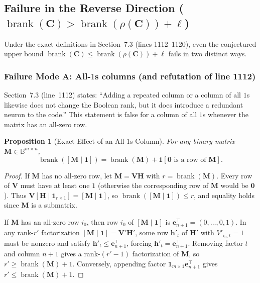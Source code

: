 \documentclass[11pt]{article}
\theoremstyle{plain}
\newtheorem{proposition}[theorem]{Proposition}
\theoremstyle{definition}
\theoremstyle{remark}
\DeclareMathOperator{\brank}{brank}
\begin{document}
\subsection{Failure in the Reverse Direction ($\brank(\mathbf{C}) > \brank(\rho(\mathbf{C})) + \ell$)}

Under the exact definitions in Section~7.3 (lines 1112--1120), even the conjectured upper bound $\brank(\mathbf{C}) \le \brank(\rho(\mathbf{C})) + \ell$ fails in two distinct ways.

\subsubsection*{Failure Mode A: All-$1$s columns (and refutation of line 1112)}

Section~7.3 (line~1112) states: ``Adding a repeated column or a column of all $1$s likewise does not change the Boolean rank, but it does introduce a redundant neuron to the code.'' This statement is false for a column of all $1$s whenever the matrix has an all-zero row.

\begin{proposition}[Exact Effect of an All-$1$s Column]\label{prop:all1}
For any binary matrix $\mathbf{M} \in \mathbb{B}^{m \times n}$,
\[
\brank([\mathbf{M} \mid \mathbf{1}]) = \brank(\mathbf{M}) + \mathbf{1}[\mathbf{0} \text{ is a row of } \mathbf{M}].
\]
\end{proposition}

\begin{proof}
If $\mathbf{M}$ has no all-zero row, let $\mathbf{M} = \mathbf{V}\mathbf{H}$ with $r = \brank(\mathbf{M})$. Every row of $\mathbf{V}$ must have at least one $1$ (otherwise the corresponding row of $\mathbf{M}$ would be $\mathbf{0}$). Thus $\mathbf{V}[\mathbf{H} \mid \mathbf{1}_{r \times 1}] = [\mathbf{M} \mid \mathbf{1}]$, so $\brank([\mathbf{M} \mid \mathbf{1}]) \le r$, and equality holds since $\mathbf{M}$ is a submatrix.

If $\mathbf{M}$ has an all-zero row $i_0$, then row $i_0$ of $[\mathbf{M} \mid \mathbf{1}]$ is $\mathbf{e}_{n+1}^\top = (0, \dots, 0, 1)$. In any rank-$r'$ factorization $[\mathbf{M} \mid \mathbf{1}] = \mathbf{V}'\mathbf{H}'$, some row $\mathbf{h}'_t$ of $\mathbf{H}'$ with $V'_{i_0, t} = 1$ must be nonzero and satisfy $\mathbf{h}'_t \le \mathbf{e}_{n+1}^\top$, forcing $\mathbf{h}'_t = \mathbf{e}_{n+1}^\top$. Removing factor $t$ and column $n+1$ gives a rank-$(r'-1)$ factorization of $\mathbf{M}$, so $r' \ge \brank(\mathbf{M}) + 1$. Conversely, appending factor $\mathbf{1}_{m \times 1} \mathbf{e}_{n+1}^\top$ gives $r' \le \brank(\mathbf{M}) + 1$.
\end{proof}
\end{document}
